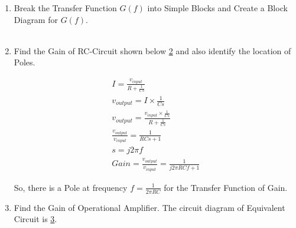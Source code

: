 \begin{enumerate}[label=\thesection.\arabic*.,ref=\thesection.\theenumi]
%
%
\item Break the Transfer Function $G(f)$ into Simple Blocks and Create a Block Diagram for $G(f)$.\\
\solution\\
\begin{figure}[ht!]
	\begin{center}
		\resizebox{\columnwidth}{!}{}
	\end{center}
	\caption{}
	\label{fig:ee18btech11014_RC Circuit}
\end{figure}

\item Find the Gain of RC-Circuit shown below \ref{fig:ee18btech11014_RC Circuit} and also identify the location of Poles.
\begin{figure}[ht!]
	\begin{center}
		\resizebox{\columnwidth/2}{!}{}
	\end{center}
	\caption{}
	\label{fig:ee18btech11014_RC Circuit}
\end{figure}

\solution
\begin{align}
I = \frac{v_{input}}{R + \frac{1}{Cs}}\\
v_{output} = I \times \frac{1}{Cs}\\
v_{output} = \frac{v_{input} \times \frac{1}{Cs}}{R + \frac{1}{Cs}}\\
\frac{v_{output}}{v_{input}} = \frac{1}{RCs + 1}\\
s = j2\pi f\\
Gain = \frac{v_{output}}{v_{input}} = \frac{1}{j2\pi RCf + 1}
\end{align}

So, there is a Pole at frequency $f = \frac{1}{2\pi RC}$ for the Transfer Function of Gain.\\
\item Find the Gain of Operational Amplifier. The circuit diagram of Equivalent Circuit is \ref{fig:ee18btech11014_OpAmp Circuit}.
\begin{figure}[ht!]
	\begin{center}
		\resizebox{\columnwidth}{!}{}
	\end{center}
	\caption{}
	\label{fig:ee18btech11014_OpAmp Circuit}
\end{figure}


\end{enumerate}
